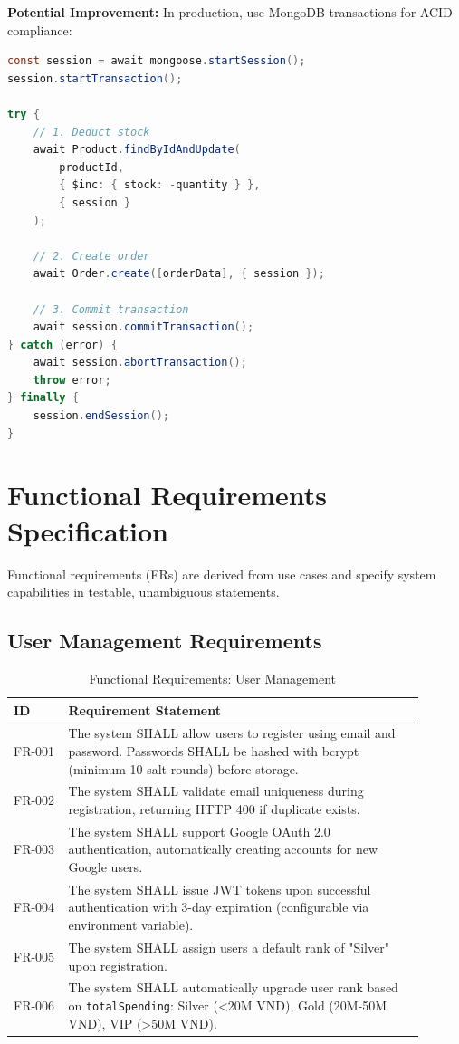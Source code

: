 \documentclass[12pt, a4paper]{report}
\begin{document}
\textbf{Potential Improvement:} In production, use MongoDB transactions for ACID compliance:

\begin{lstlisting}[language=Java, caption=Transaction-based Order Placement (Future Enhancement)]
const session = await mongoose.startSession();
session.startTransaction();

try {
    // 1. Deduct stock
    await Product.findByIdAndUpdate(
        productId, 
        { $inc: { stock: -quantity } },
        { session }
    );
    
    // 2. Create order
    await Order.create([orderData], { session });
    
    // 3. Commit transaction
    await session.commitTransaction();
} catch (error) {
    await session.abortTransaction();
    throw error;
} finally {
    session.endSession();
}
\end{lstlisting}

\section{Functional Requirements Specification}

Functional requirements (FRs) are derived from use cases and specify system capabilities in testable, unambiguous statements.

\subsection{User Management Requirements}

\begin{table}[H]
\centering
\caption{Functional Requirements: User Management}
\label{tab:fr_user}
\small
\begin{tabular}{@{}p{0.12\linewidth}p{0.78\linewidth}@{}}
\toprule
\textbf{ID} & \textbf{Requirement Statement} \\
\midrule
FR-001 & The system SHALL allow users to register using email and password. Passwords SHALL be hashed with bcrypt (minimum 10 salt rounds) before storage. \\
FR-002 & The system SHALL validate email uniqueness during registration, returning HTTP 400 if duplicate exists. \\
FR-003 & The system SHALL support Google OAuth 2.0 authentication, automatically creating accounts for new Google users. \\
FR-004 & The system SHALL issue JWT tokens upon successful authentication with 3-day expiration (configurable via environment variable). \\
FR-005 & The system SHALL assign users a default rank of "Silver" upon registration. \\
FR-006 & The system SHALL automatically upgrade user rank based on \texttt{totalSpending}: Silver (\textless 20M VND), Gold (20M-50M VND), VIP (\textgreater 50M VND). \\
\bottomrule
\end{tabular}
\end{table}
\end{document}
